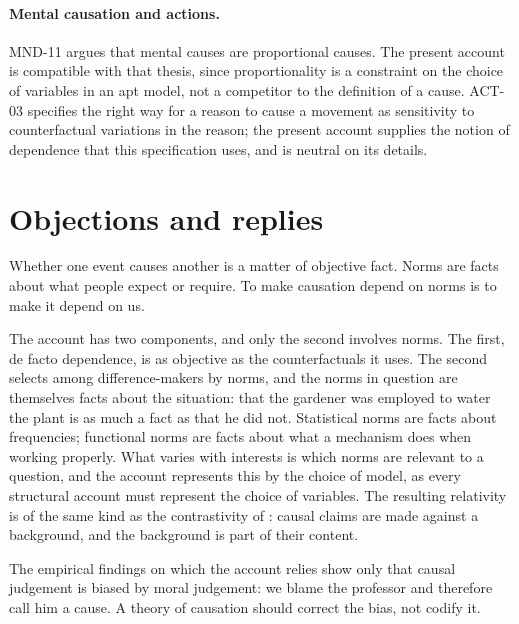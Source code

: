 \documentclass{situationist-preprint}
\begin{document}
\paragraph{Mental causation and actions.} MND-11 argues that mental causes are proportional causes. The present account is compatible with that thesis, since proportionality is a constraint on the choice of variables in an apt model, not a competitor to the definition of a cause. ACT-03 specifies the right way for a reason to cause a movement as sensitivity to counterfactual variations in the reason; the present account supplies the notion of dependence that this specification uses, and is neutral on its details.

\section{Objections and replies}\label{s:objections}

\begin{objection}
Whether one event causes another is a matter of objective fact. Norms are facts about what people expect or require. To make causation depend on norms is to make it depend on us.
\end{objection}

\begin{reply}
The account has two components, and only the second involves norms. The first, de facto dependence, is as objective as the counterfactuals it uses. The second selects among difference-makers by norms, and the norms in question are themselves facts about the situation: that the gardener was employed to water the plant is as much a fact as that he did not. Statistical norms are facts about frequencies; functional norms are facts about what a mechanism does when working properly. What varies with interests is which norms are relevant to a question, and the account represents this by the choice of model, as every structural account must represent the choice of variables. The resulting relativity is of the same kind as the contrastivity of \citet{Schaffer2005}: causal claims are made against a background, and the background is part of their content.
\end{reply}

\begin{objection}[Contamination]
The empirical findings on which the account relies show only that causal judgement is biased by moral judgement: we blame the professor and therefore call him a cause. A theory of causation should correct the bias, not codify it.
\end{objection}
\end{document}

